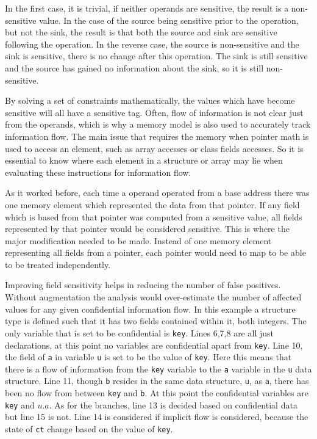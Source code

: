 \documentclass[11pt,a4paper]{article}
\begin{document}
  In the first case, it is trivial, if neither operands are sensitive, the
  result is a non-sensitive value. In the case of the source being sensitive
  prior to the operation, but not the sink, the result is that both the source
  and sink are sensitive following the operation. In the reverse case, the
  source is non-sensitive and the sink is sensitive, there is no change after
  this operation. The sink is still sensitive and the source has gained no
  information about the sink, so it is still non-sensitive.

  By solving a set of constraints mathematically, the values which have become
  sensitive will all have a sensitive tag. Often, flow of information is not
  clear just from the operands, which is why a memory model is also used to
  accurately track information flow. The main issue that requires the memory
  when pointer math is used to access an element, such as array accesses or
  class fields accesses. So it is essential to know where each element in a
  structure or array may lie when evaluating these instructions for information
  flow.

  As it worked before, each time a operand operated from a base address
  there was one memory element which represented the data from that pointer. If
  any field which is based from that pointer was computed from a sensitive
  value, all fields represented by that pointer would be considered sensitive.
  This is where the major modification needed to be made. Instead of one memory
  element representing all fields from a pointer, each pointer would need to map
  to be able to be treated independently.

  Improving field sensitivity helps in reducing the number of false positives.
  Without augmentation the analysis would over-estimate the number of affected
  values for any given confidential information flow. In this example a
  structure type is defined such that it has two fields contained within it,
  both integers. The only variable that is set to be confidential is
  \texttt{key}. Lines 6,7,8 are all just declarations, at this point no
  variables are confidential apart from \texttt{key}. Line 10, the field of
  \texttt{a} in variable \texttt{u} is set to be the value of \texttt{key}. Here
  this means that there is a flow of information from the \texttt{key} variable
  to the \texttt{a} variable in the \texttt{u} data structure. Line 11, though
  \texttt{b} resides in the same data structure, \texttt{u}, as \texttt{a},
  there has been no flow from between \texttt{key} and \texttt{b}. At this point
  the confidential variables are \texttt{key} and $u.a$. As for the branches,
  line 13 is decided based on confidential data but line 15 is not. Line 14 is
  considered if implicit flow is considered, because the state of \texttt{ct}
  change based on the value of \texttt{key}.
\end{document}
